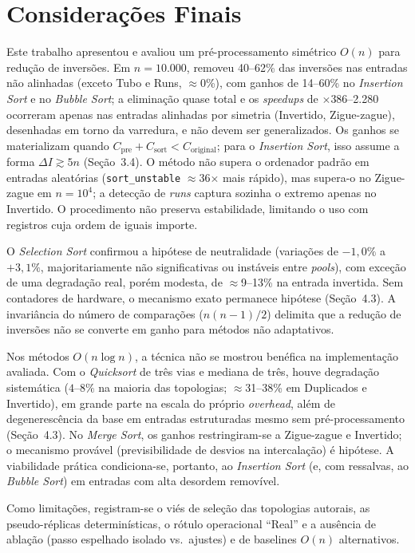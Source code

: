 \documentclass[portuguese]{sbc2025}%
\begin{document}
\section{Considerações Finais}

Este trabalho apresentou e avaliou um pré-processamento simétrico $O(n)$ para redução de inversões. Em $n{=}10.000$, removeu 40--62\% das inversões nas entradas não alinhadas (exceto Tubo e Runs, $\approx$0\%), com ganhos de 14--60\% no \emph{Insertion Sort} e no \emph{Bubble Sort}; a eliminação quase total e os \emph{speedups} de $\times$386--2.280 ocorreram apenas nas entradas alinhadas por simetria (Invertido, Zigue-zague), desenhadas em torno da varredura, e não devem ser generalizados. Os ganhos se materializam quando $C_{\text{pre}} + C_{\text{sort}} < C_{\text{original}}$; para o \emph{Insertion Sort}, isso assume a forma $\Delta I \gtrsim 5n$ (Seção~3.4). O método não supera o ordenador padrão em entradas aleatórias (\texttt{sort\_unstable} $\approx$36$\times$ mais rápido), mas supera-o no Zigue-zague em $n{=}10^4$; a detecção de \emph{runs} captura sozinha o extremo apenas no Invertido. O procedimento não preserva estabilidade, limitando o uso com registros cuja ordem de iguais importe.

O \emph{Selection Sort} confirmou a hipótese de neutralidade (variações de $-1{,}0\%$ a $+3{,}1\%$, majoritariamente não significativas ou instáveis entre \emph{pools}), com exceção de uma degradação real, porém modesta, de $\approx$9--13\% na entrada invertida. Sem contadores de hardware, o mecanismo exato permanece hipótese (Seção~4.3). A invariância do número de comparações ($n(n-1)/2$) delimita que a redução de inversões não se converte em ganho para métodos não adaptativos.

Nos métodos $O(n \log n)$, a técnica não se mostrou benéfica na implementação avaliada. Com o \emph{Quicksort} de três vias e mediana de três, houve degradação sistemática ($4$--$8\%$ na maioria das topologias; $\approx$31--38\% em Duplicados e Invertido), em grande parte na escala do próprio \emph{overhead}, além de degenerescência da base em entradas estruturadas mesmo sem pré-processamento (Seção~4.3). No \emph{Merge Sort}, os ganhos restringiram-se a Zigue-zague e Invertido; o mecanismo provável (previsibilidade de desvios na intercalação) é hipótese. A viabilidade prática condiciona-se, portanto, ao \emph{Insertion Sort} (e, com ressalvas, ao \emph{Bubble Sort}) em entradas com alta desordem removível.

Como limitações, registram-se o viés de seleção das topologias autorais, as pseudo-réplicas determinísticas, o rótulo operacional ``Real'' e a ausência de ablação (passo espelhado isolado vs.\ ajustes) e de baselines $O(n)$ alternativos.
\end{document}
